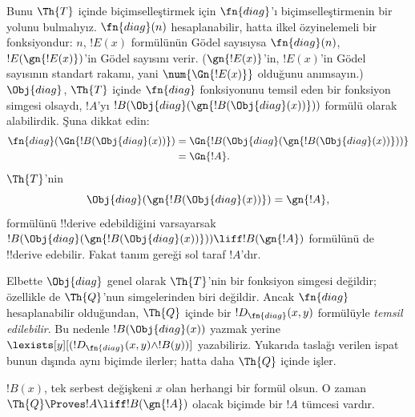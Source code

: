 \documentclass[../../../include/open-logic-section]{subfiles}
\begin{document}
\begin{explain}
Bunu $\Th{T}$ içinde biçimselleştirmek için $\fn{diag}$'ı
biçimselleştirmenin bir yolunu bulmalıyız. $\fn{diag}(n)$ hesaplanabilir,
hatta ilkel özyinelemeli bir fonksiyondur: $n$, $!E(x)$ formülünün G\"odel
sayısıysa $\fn{diag}(n)$, $!E(\gn{!E(x)})$'in G\"odel sayısını verir.
($\gn{!E(x)}$'in, $!E(x)$'in G\"odel sayısının standart rakamı, yani
$\num{\Gn{!E(x)}}$ olduğunu anımsayın.) $\Obj{diag}$, $\Th{T}$ içinde
$\fn{diag}$ fonksiyonunu temsil eden bir fonksiyon simgesi olsaydı, $!A$'yı
$!B(\Obj{diag}(\gn{!B(\Obj{diag}(x))}))$ formülü olarak alabilirdik. Şuna
dikkat edin:
\begin{align*}
\fn{diag}(\Gn{!B(\Obj{diag}(x))}) & = 
\Gn{!B(\Obj{diag}(\gn{!B(\Obj{diag}(x))}))} \\
& = \Gn{!A}.
\end{align*}
$\Th{T}$'nin
\[
\Obj{diag}(\gn{!B(\Obj{diag}(x))}) = \gn{!A},
\]
formülünü !!{derive} edebildiğini varsayarsak
$!B(\Obj{diag}(\gn{!B(\Obj{diag}(x))})) \liff !B(\gn{!A})$ formülünü de
!!{derive} edebilir. Fakat tanım gereği sol taraf $!A$'dır.

Elbette $\Obj{diag}$ genel olarak $\Th{T}$'nin bir fonksiyon simgesi değildir;
özellikle de $\Th{Q}$'nun simgelerinden biri değildir. Ancak $\fn{diag}$
hesaplanabilir olduğundan, $\Th{Q}$ içinde bir
$!D_{\fn{diag}}(x,y)$ formülüyle \emph{temsil edilebilir}. Bu nedenle
$!B(\Obj{diag}(x))$ yazmak yerine
$\lexists[y][(!D_{\fn{diag}}(x,y) \land !B(y))]$ yazabiliriz. Yukarıda
taslağı verilen ispat bunun dışında aynı biçimde ilerler; hatta daha
$\Th{Q}$ içinde işler.
\end{explain}

\begin{lem}
 $!B(x)$, tek serbest değişkeni $x$ olan herhangi
bir formül olsun. O zaman $\Th{Q} \Proves !A \liff !B(\gn{!A})$ olacak
biçimde bir $!A$ tümcesi vardır.
\end{lem}
\end{document}
